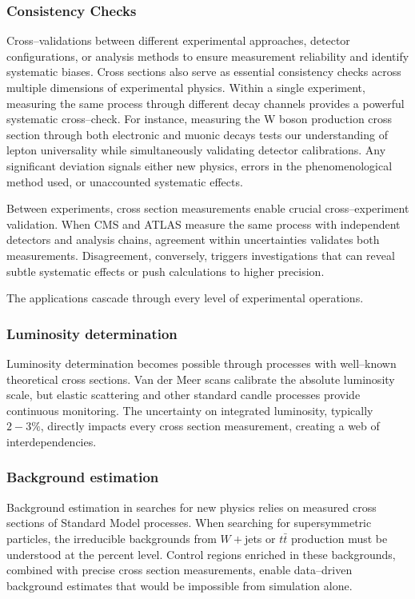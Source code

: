         \subsubsection{Consistency Checks}
            Cross--validations between different experimental approaches, detector configurations, or analysis methods to ensure measurement reliability and identify systematic biases.
            Cross sections also serve as essential consistency checks across multiple dimensions of experimental physics.
            Within a single experiment, measuring the same process through different decay channels provides a powerful systematic cross--check.
            For instance, measuring the W boson production cross section through both electronic and muonic decays tests our understanding of lepton universality while simultaneously validating detector calibrations.
            Any significant deviation signals either new physics, errors in the phenomenological method used, or unaccounted systematic effects.
            
            Between experiments, cross section measurements enable crucial cross--experiment validation.
            When CMS and ATLAS measure the same process with independent detectors and analysis chains, agreement within uncertainties validates both measurements.
            Disagreement, conversely, triggers investigations that can reveal subtle systematic effects or push calculations to higher precision.

            The applications cascade through every level of experimental operations.
        \subsubsection{Luminosity determination}
            Luminosity determination becomes possible through processes with well--known theoretical cross sections.
            Van der Meer scans calibrate the absolute luminosity scale, but elastic scattering and other standard candle processes provide continuous monitoring.
            The uncertainty on integrated luminosity, typically \(2-3\%\), directly impacts every cross section measurement, creating a web of interdependencies.
            
        \subsubsection{Background estimation}
            Background estimation in searches for new physics relies on measured cross sections of Standard Model processes.
            When searching for supersymmetric particles, the irreducible backgrounds from \(W+\)jets or \(t\bar t\) production must be understood at the percent level.
            Control regions enriched in these backgrounds, combined with precise cross section measurements, enable data--driven background estimates that would be impossible from simulation alone.
